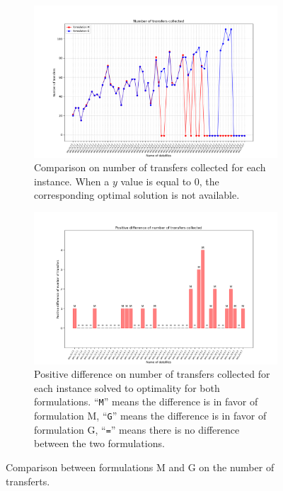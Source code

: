\documentclass[preprint,12pt,authoryear]{elsarticle}
\begin{document}
\begin{figure}[h!]
  \begin{center}
    \begin{subfigure}{1\textwidth}
      \includegraphics[scale=0.45]{images/resultsMGnbrTft.png}
      \caption{Comparison on number of transfers  collected for each instance. When a $y$ value is equal to 0, the corresponding optimal solution is not available.}
      \label{fig:resNbrTfsMG}
    \end{subfigure}
    \begin{subfigure}{1\textwidth}
      \includegraphics[scale=0.45]{images/resultsMGdifference.png}
      \caption{Positive difference on number of transfers  collected for each instance solved to optimality for both formulations. ``\texttt{M}'' means the difference is in favor of formulation M, ``\texttt{G}'' means the difference is in favor of formulation G,  ``\texttt{=}'' means there is no difference between the two formulations.}
      \label{fig:resDiffTfsMG}
    \end{subfigure}
  \end{center}
  \caption{Comparison between formulations M and G on the number of transferts.}
   \label{fig:res2MG}
\end{figure}
\end{document}
